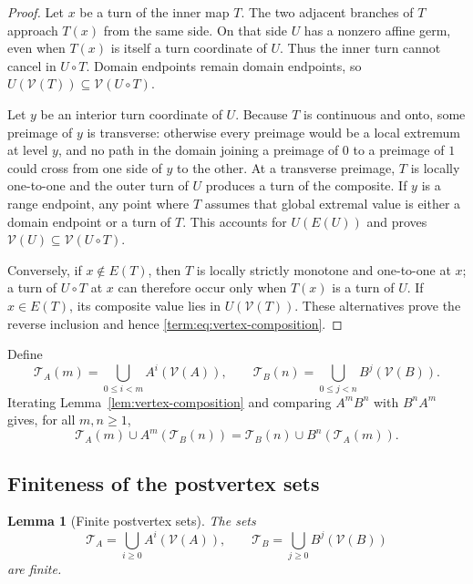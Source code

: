 \documentclass[11pt]{article}
\newtheorem{lemma}[theorem]{Lemma}
\theoremstyle{definition}
\theoremstyle{remark}
\begin{document}
\begin{proof}
Let $x$ be a turn of the inner map $T$.  The two adjacent branches of $T$
approach $T(x)$ from the same side.  On that side $U$ has a nonzero affine
germ, even when $T(x)$ is itself a turn coordinate of $U$.  Thus the inner
turn cannot cancel in $U\circ T$.  Domain endpoints remain domain endpoints,
so
$U(\mathcal V(T))\subseteq\mathcal V(U\circ T)$.

Let $y$ be an interior turn coordinate of $U$.  Because $T$ is continuous
and onto, some preimage of $y$ is transverse: otherwise every preimage would
be a local extremum at level $y$, and no path in the domain joining a
preimage of $0$ to a preimage of $1$ could cross from one side of $y$ to the
other.  At a transverse preimage, $T$ is locally one-to-one and the outer
turn of $U$ produces a turn of the composite.  If $y$ is a range endpoint,
any point where $T$ assumes that global extremal value is either a domain
endpoint or a turn of $T$.  This accounts for $U(E(U))$ and proves
$\mathcal V(U)\subseteq\mathcal V(U\circ T)$.

Conversely, if $x\notin E(T)$, then $T$ is locally strictly monotone and
one-to-one at $x$; a turn of $U\circ T$ at $x$ can therefore occur only when
$T(x)$ is a turn of $U$.  If $x\in E(T)$, its composite value lies in
$U(\mathcal V(T))$.  These alternatives prove the reverse inclusion and
hence \eqref{term:eq:vertex-composition}.
\end{proof}

Define
\begin{equation}\label{term:eq:TA-TB}
 \mathcal T_A(m)=\bigcup_{0\leq i<m}A^i(\mathcal V(A)),\qquad
 \mathcal T_B(n)=\bigcup_{0\leq j<n}B^j(\mathcal V(B)).
\end{equation}
Iterating Lemma~\ref{lem:vertex-composition} and comparing $A^mB^n$ with
$B^nA^m$ gives, for all $m,n\geq1$,
\begin{equation}\label{term:eq:rectangle-identity}
 \mathcal T_A(m)\cup A^m(\mathcal T_B(n))
 =
 \mathcal T_B(n)\cup B^n(\mathcal T_A(m)).
\end{equation}

\subsection{Finiteness of the postvertex sets}

\begin{lemma}[Finite postvertex sets]
\label{lem:finite-postvertex}
The sets
\[
 \mathcal T_A=\bigcup_{i\geq0}A^i(\mathcal V(A)),\qquad
 \mathcal T_B=\bigcup_{j\geq0}B^j(\mathcal V(B))
\]
are finite.
\end{lemma}
\end{document}
